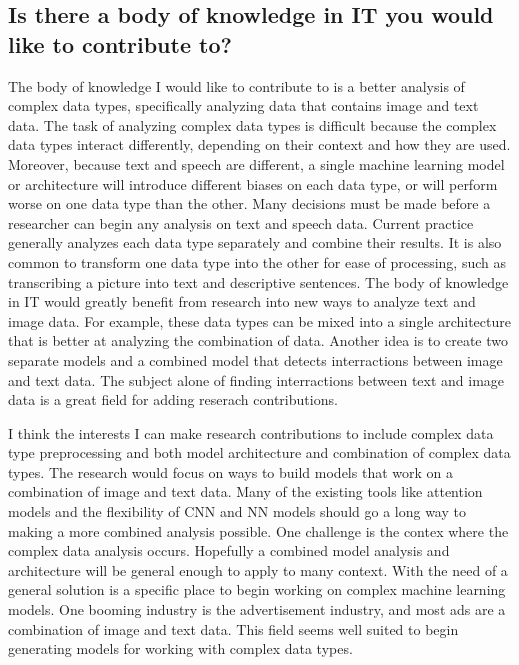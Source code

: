 \subsection{Is there a body of knowledge in IT you would like to contribute to?}

The body of knowledge I would like to contribute to is a better analysis of complex data types, specifically analyzing data that contains image and text data.  The task of analyzing complex data types is difficult because the complex data types interact differently, depending on their context and how they are used.  Moreover, because text and speech are different, a single machine learning model or architecture will introduce different biases on each data type, or will perform worse on one data type than the other. Many decisions must be made before a researcher can begin any analysis on text and speech data. Current practice generally analyzes each data type separately and combine their results. It is also common to transform one data type into the other for ease of processing, such as transcribing a picture into text and descriptive sentences. The body of knowledge in IT would greatly benefit from research into new ways to analyze text and image data.  For example, these data types can be mixed into a single architecture that is better at analyzing the combination of data.  Another idea is to create two separate models and a combined model that detects interractions between image and text data.  The subject alone of finding interractions between text and image data is a great field for adding reserach contributions.

I think the interests I can make research contributions to include complex data type preprocessing and both model architecture and combination of complex data types.  The research would focus on ways to build models that work on a combination of image and text data.  Many of the existing tools like attention models and the flexibility of CNN and NN models should go a long way to making a more combined analysis possible.  One challenge is the contex where the complex data analysis occurs.  Hopefully a combined model analysis and architecture will be general enough to apply to many context.  With the need of a general solution is a specific place to begin working on complex machine learning models.  One booming industry is the advertisement industry, and most ads are a combination of image and text data.  This field seems well suited to begin generating models for working with complex data types.  
